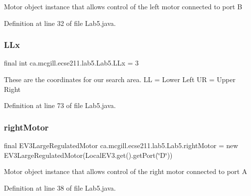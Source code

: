 Motor object instance that allows control of the left motor connected to port B 

Definition at line 32 of file Lab5.\+java.

\mbox{\label{classca_1_1mcgill_1_1ecse211_1_1lab5_1_1_lab5_a957a526ed669e9d8b7fc485e21385ee9}} 
\subsubsection{\texorpdfstring{L\+Lx}{LLx}}
{\footnotesize\ttfamily final int ca.\+mcgill.\+ecse211.\+lab5.\+Lab5.\+L\+Lx = 3\hspace{0.3cm}{\ttfamily [static]}}

These are the coordinates for our search area. LL = Lower Left UR = Upper Right 

Definition at line 73 of file Lab5.\+java.

\mbox{\label{classca_1_1mcgill_1_1ecse211_1_1lab5_1_1_lab5_a70575e1c6e84cd9d22cadd141ad6ceae}} 
\subsubsection{\texorpdfstring{right\+Motor}{rightMotor}}
{\footnotesize\ttfamily final E\+V3\+Large\+Regulated\+Motor ca.\+mcgill.\+ecse211.\+lab5.\+Lab5.\+right\+Motor = new E\+V3\+Large\+Regulated\+Motor(Local\+E\+V3.\+get().get\+Port(\char`\"{}D\char`\"{}))\hspace{0.3cm}{\ttfamily [static]}}

Motor object instance that allows control of the right motor connected to port A 

Definition at line 38 of file Lab5.\+java.

\mbox{\label{classca_1_1mcgill_1_1ecse211_1_1lab5_1_1_lab5_a39cbd32759fdb575b92b694f2713085d}} 

